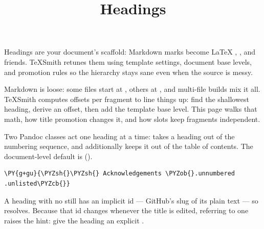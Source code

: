 \documentclass[a4paper,twoside]{article}
\title{Headings}
\author{}\date{}
\begin{document}
\maketitle
Headings are your document's scaffold: Markdown \tscodeinline{\#} marks become \LaTeX{} , , and friends. TeXSmith retunes them using template settings, document base levels, and promotion rules so the hierarchy stays sane even when the source is messy.

Markdown is loose: some files start at \tscodeinline{\#\#}, others at \tscodeinline{\#\#\#}, and multi-file builds mix it all. TeXSmith computes offsets per fragment to line things up: find the shallowest heading, derive an offset, then add the template base level. This page walks that math, how title promotion changes it, and how slots keep fragments independent.

Two Pandoc classes act one heading at a time:  takes a heading out
of the numbering sequence, and  additionally keeps it out of the table
of contents. The document-level default is  ().
\begin{tscode}[lang=md, engine=pygments]
\begin{Verbatim}[commandchars=\\\{\},breaklines, breakanywhere, commandchars=\\\{\}]
\PY{g+gu}{\PYZsh{}\PYZsh{} Acknowledgements \PYZob{}.unnumbered .unlisted\PYZcb{}}
\end{Verbatim}
\end{tscode}
A heading with no  still has an implicit id --- GitHub's slug of its plain
text --- so  resolves. Because that id changes whenever the
title is edited, referring to one raises the  hint: give the
heading an explicit .
\end{document}
